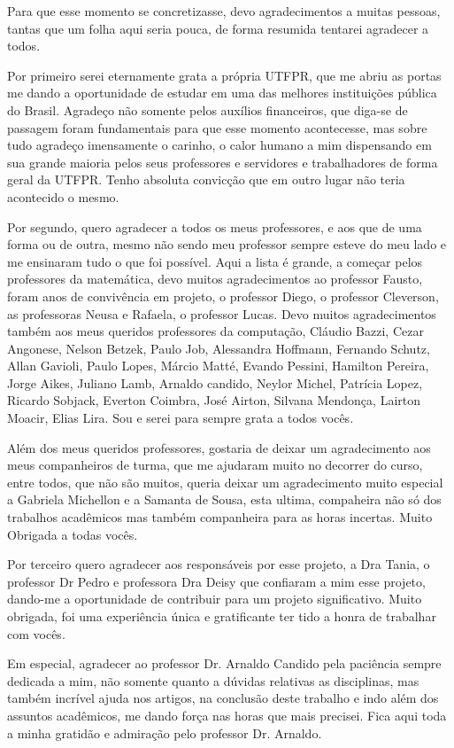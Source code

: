 Para que esse momento se concretizasse, devo agradecimentos a muitas pessoas, tantas que um folha aqui seria pouca, de forma resumida tentarei agradecer a todos.

Por primeiro serei eternamente grata a própria UTFPR, que me abriu as portas me dando a oportunidade de estudar em uma das melhores instituições pública do Brasil. Agradeço não somente pelos auxílios financeiros, que diga-se de passagem foram fundamentais para que esse momento acontecesse, mas sobre tudo agradeço imensamente o carinho, o calor humano a mim dispensando em sua grande maioria pelos seus professores e servidores e trabalhadores de forma geral da UTFPR. Tenho absoluta convicção que em outro lugar não teria acontecido o mesmo.

Por segundo, quero agradecer a todos os meus professores, e aos que de uma forma ou de outra, mesmo não sendo meu professor sempre esteve do meu lado e me ensinaram tudo o que foi possível. Aqui a lista é grande, a começar pelos professores da matemática, devo muitos agradecimentos ao professor Fausto, foram anos de convivência em projeto, o professor Diego, o professor Cleverson, as professoras Neusa e Rafaela, o professor Lucas. Devo muitos agradecimentos também aos meus queridos professores da computação, Cláudio Bazzi, Cezar Angonese, Nelson Betzek, Paulo Job, Alessandra Hoffmann, Fernando Schutz, Allan Gavioli, Paulo Lopes, Márcio Matté, Evando Pessini, Hamilton Pereira, Jorge Aikes, Juliano Lamb, Arnaldo candido, Neylor Michel, Patrícia Lopez, Ricardo Sobjack, Everton Coimbra, José Airton, Silvana Mendonça, Lairton Moacir, Elias Lira. Sou e serei para sempre grata a todos vocês. 

Além dos meus queridos professores, gostaria de deixar um agradecimento aos meus companheiros de turma, que me ajudaram muito no decorrer do curso, entre todos, que não são muitos, queria deixar um agradecimento muito especial a Gabriela Michellon e a Samanta de Sousa, esta ultima, compaheira não só dos trabalhos acadêmicos mas também companheira para as horas incertas. Muito Obrigada a todas vocês.

Por terceiro quero agradecer aos responsáveis por esse projeto, a Dra Tania, o professor Dr Pedro e professora Dra Deisy que confiaram a mim esse projeto, dando-me a oportunidade de contribuir para um projeto significativo. Muito obrigada, foi uma experiência única e gratificante ter tido a honra de trabalhar com vocês.

Em especial, agradecer ao professor Dr. Arnaldo Candido pela paciência sempre dedicada a mim, não somente quanto a dúvidas relativas as disciplinas, mas também incrível ajuda nos artigos, na conclusão deste trabalho e indo além dos assuntos acadêmicos, me dando força nas horas que mais precisei. Fica aqui toda a minha gratidão e admiração pelo professor Dr. Arnaldo.

